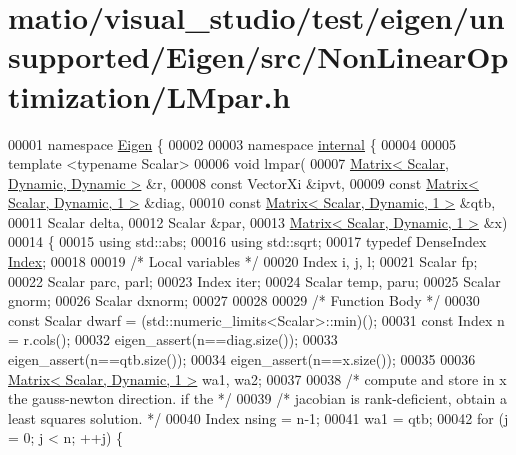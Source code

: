 \hypertarget{matio_2visual__studio_2test_2eigen_2unsupported_2_eigen_2src_2_non_linear_optimization_2_l_mpar_8h_source}{}\section{matio/visual\+\_\+studio/test/eigen/unsupported/\+Eigen/src/\+Non\+Linear\+Optimization/\+L\+Mpar.h}
\label{matio_2visual__studio_2test_2eigen_2unsupported_2_eigen_2src_2_non_linear_optimization_2_l_mpar_8h_source}

\begin{DoxyCode}
00001 \textcolor{keyword}{namespace }\hyperlink{namespace_eigen}{Eigen} \{ 
00002 
00003 \textcolor{keyword}{namespace }\hyperlink{namespaceinternal}{internal} \{
00004 
00005 \textcolor{keyword}{template} <\textcolor{keyword}{typename} Scalar>
00006 \textcolor{keywordtype}{void} lmpar(
00007         \hyperlink{group___core___module}{Matrix< Scalar, Dynamic, Dynamic >} &r,
00008         \textcolor{keyword}{const} VectorXi &ipvt,
00009         \textcolor{keyword}{const} \hyperlink{group___core___module}{Matrix< Scalar, Dynamic, 1 >}  &diag,
00010         \textcolor{keyword}{const} \hyperlink{group___core___module}{Matrix< Scalar, Dynamic, 1 >}  &qtb,
00011         Scalar delta,
00012         Scalar &par,
00013         \hyperlink{group___core___module}{Matrix< Scalar, Dynamic, 1 >}  &x)
00014 \{
00015     \textcolor{keyword}{using} std::abs;
00016     \textcolor{keyword}{using} std::sqrt;
00017     \textcolor{keyword}{typedef} DenseIndex \hyperlink{namespace_eigen_a62e77e0933482dafde8fe197d9a2cfde}{Index};
00018 
00019     \textcolor{comment}{/* Local variables */}
00020     Index i, j, l;
00021     Scalar fp;
00022     Scalar parc, parl;
00023     Index iter;
00024     Scalar temp, paru;
00025     Scalar gnorm;
00026     Scalar dxnorm;
00027 
00028 
00029     \textcolor{comment}{/* Function Body */}
00030     \textcolor{keyword}{const} Scalar dwarf = (std::numeric\_limits<Scalar>::min)();
00031     \textcolor{keyword}{const} Index n = r.cols();
00032     eigen\_assert(n==diag.size());
00033     eigen\_assert(n==qtb.size());
00034     eigen\_assert(n==x.size());
00035 
00036     \hyperlink{group___core___module}{Matrix< Scalar, Dynamic, 1 >}  wa1, wa2;
00037 
00038     \textcolor{comment}{/* compute and store in x the gauss-newton direction. if the */}
00039     \textcolor{comment}{/* jacobian is rank-deficient, obtain a least squares solution. */}
00040     Index nsing = n-1;
00041     wa1 = qtb;
00042     \textcolor{keywordflow}{for} (j = 0; j < n; ++j) \{

\end{DoxyCode}
